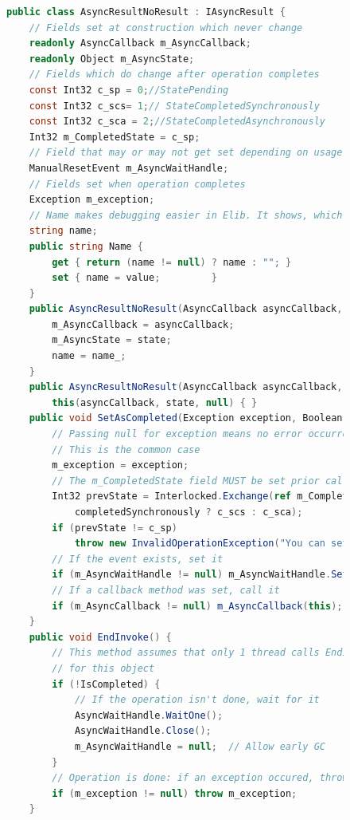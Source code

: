 \documentclass[12pt,notitlepage]{report}
\begin{document}
\begin{figure}[!hbp]	
\begin{lstlisting}[language=cs]
public class AsyncResultNoResult : IAsyncResult {
	// Fields set at construction which never change 
	readonly AsyncCallback m_AsyncCallback;
	readonly Object m_AsyncState;
	// Fields which do change after operation completes
	const Int32 c_sp = 0;//StatePending
	const Int32 c_scs= 1;// StateCompletedSynchronously
	const Int32 c_sca = 2;//StateCompletedAsynchronously
	Int32 m_CompletedState = c_sp;
	// Field that may or may not get set depending on usage
	ManualResetEvent m_AsyncWaitHandle;
	// Fields set when operation completes
	Exception m_exception;
	// Name makes debugging easier in Elib. It shows, which command was used.
	string name;
	public string Name { 
		get { return (name != null) ? name : ""; } 
		set { name = value; 		} 
	}
	public AsyncResultNoResult(AsyncCallback asyncCallback, Object state, string name_) {
		m_AsyncCallback = asyncCallback;
		m_AsyncState = state;
		name = name_;
	}
	public AsyncResultNoResult(AsyncCallback asyncCallback, Object state) : 
		this(asyncCallback, state, null) { }
	public void SetAsCompleted(Exception exception, Boolean completedSynchronously) {
		// Passing null for exception means no error occurred. 
		// This is the common case
		m_exception = exception;
		// The m_CompletedState field MUST be set prior calling the callback
		Int32 prevState = Interlocked.Exchange(ref m_CompletedState, 
			completedSynchronously ? c_scs : c_sca);
		if (prevState != c_sp)
			throw new InvalidOperationException("You can set a result only once");
		// If the event exists, set it
		if (m_AsyncWaitHandle != null) m_AsyncWaitHandle.Set();
		// If a callback method was set, call it
		if (m_AsyncCallback != null) m_AsyncCallback(this);
	}
	public void EndInvoke() {
		// This method assumes that only 1 thread calls EndInvoke 
		// for this object
		if (!IsCompleted) {
			// If the operation isn't done, wait for it
			AsyncWaitHandle.WaitOne();
			AsyncWaitHandle.Close();
			m_AsyncWaitHandle = null;  // Allow early GC
		}      
		// Operation is done: if an exception occured, throw it
		if (m_exception != null) throw m_exception;
	}


\end{lstlisting}
\end{figure}
\end{document}

